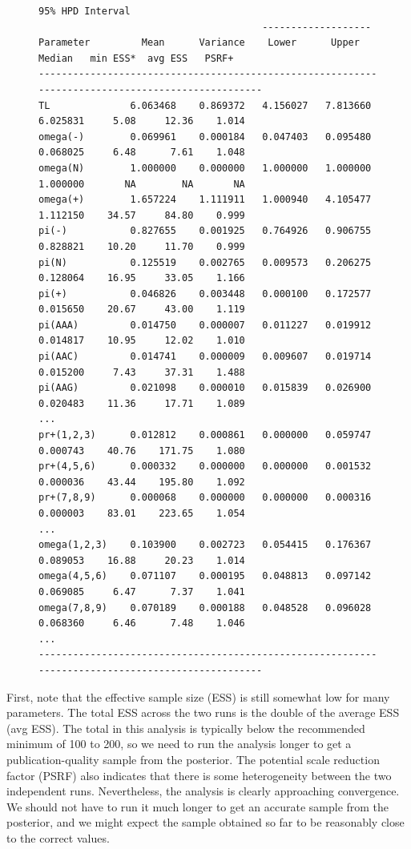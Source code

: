 \documentclass[12pt]{book}
\begin{document}
\begin{figure}[H]
\centering
\begin{BVerbatim}[fontsize=\scriptsize]
                                         95% HPD Interval
                                       -------------------
Parameter         Mean      Variance    Lower      Upper       Median   min ESS*  avg ESS   PSRF+ 
--------------------------------------------------------------------------------------------------
TL              6.063468    0.869372   4.156027   7.813660    6.025831     5.08     12.36    1.014
omega(-)        0.069961    0.000184   0.047403   0.095480    0.068025     6.48      7.61    1.048
omega(N)        1.000000    0.000000   1.000000   1.000000    1.000000       NA        NA       NA   
omega(+)        1.657224    1.111911   1.000940   4.105477    1.112150    34.57     84.80    0.999
pi(-)           0.827655    0.001925   0.764926   0.906755    0.828821    10.20     11.70    0.999
pi(N)           0.125519    0.002765   0.009573   0.206275    0.128064    16.95     33.05    1.166
pi(+)           0.046826    0.003448   0.000100   0.172577    0.015650    20.67     43.00    1.119
pi(AAA)         0.014750    0.000007   0.011227   0.019912    0.014817    10.95     12.02    1.010
pi(AAC)         0.014741    0.000009   0.009607   0.019714    0.015200     7.43     37.31    1.488
pi(AAG)         0.021098    0.000010   0.015839   0.026900    0.020483    11.36     17.71    1.089
...
pr+(1,2,3)      0.012812    0.000861   0.000000   0.059747    0.000743    40.76    171.75    1.080
pr+(4,5,6)      0.000332    0.000000   0.000000   0.001532    0.000036    43.44    195.80    1.092
pr+(7,8,9)      0.000068    0.000000   0.000000   0.000316    0.000003    83.01    223.65    1.054
...
omega(1,2,3)    0.103900    0.002723   0.054415   0.176367    0.089053    16.88     20.23    1.014
omega(4,5,6)    0.071107    0.000195   0.048813   0.097142    0.069085     6.47      7.37    1.041
omega(7,8,9)    0.070189    0.000188   0.048528   0.096028    0.068360     6.46      7.48    1.046
...
--------------------------------------------------------------------------------------------------
\end{BVerbatim}
\end{figure}

First, note that the effective sample size (ESS) is still somewhat low for many parameters. The
total ESS across the two runs is the double of the average ESS (avg ESS). The total in this
analysis is typically below the recommended minimum of 100 to 200, so we need to run the analysis
longer to get a publication-quality sample from the posterior. The potential scale reduction factor
(PSRF) also indicates that there is some heterogeneity between the two independent runs.
Nevertheless, the analysis is clearly approaching convergence. We should not have to run it much
longer to get an accurate sample from the posterior, and we might expect the sample obtained so far
to be reasonably close to the correct values.
\end{document}

